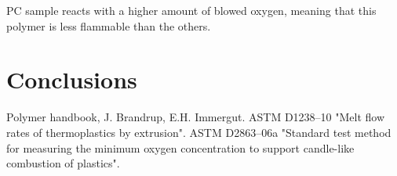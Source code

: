 \documentclass[a4paper, 11pt]{article}
\begin{document}
PC sample reacts with a higher amount of blowed oxygen, meaning that this polymer is less flammable than the others.
\newpage 
\section{Conclusions}

\newpage

\thispagestyle{empty}

\begin{thebibliography}{1}

 Polymer handbook, J. Brandrup, E.H. Immergut.
 ASTM D1238–10 "Melt flow rates of thermoplastics by extrusion". 
 ASTM D2863–06a "Standard test method for measuring the minimum oxygen concentration to support candle-like combustion of plastics".

\end{thebibliography}
\end{document}
